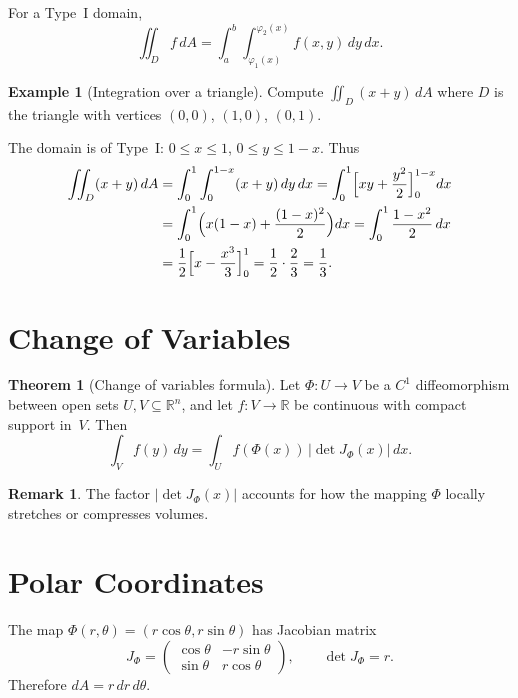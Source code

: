 \documentclass[12pt,a4paper]{book}
\theoremstyle{definition}
\newtheorem{theorem}{Theorem}[chapter]
\newtheorem{remark}{Remark}[chapter]
\newtheorem{example}{Example}[chapter]
\begin{document}
For a Type~I domain,
\[
  \iint_D f\,dA = \int_a^b\int_{\varphi_1(x)}^{\varphi_2(x)}
  f(x,y)\,dy\,dx.
\]

\begin{example}[Integration over a triangle]
\label{ex:triangle-integral}
Compute $\iint_D (x+y)\,dA$ where $D$ is the triangle with vertices
$(0,0)$, $(1,0)$, $(0,1)$.

The domain is of Type~I: $0\le x\le 1$, $0\le y\le 1-x$.  Thus
\begin{align*}
  \iint_D (x+y)\,dA
  &= \int_0^1\int_0^{1-x}(x+y)\,dy\,dx
  = \int_0^1\Bigl[xy+\frac{y^2}{2}\Bigr]_0^{1-x}dx \\
  &= \int_0^1\Bigl(x(1-x)+\frac{(1-x)^2}{2}\Bigr)dx
  = \int_0^1\frac{1-x^2}{2}\,dx \\
  &= \frac{1}{2}\Bigl[x-\frac{x^3}{3}\Bigr]_0^1
  = \frac{1}{2}\cdot\frac{2}{3}=\frac{1}{3}.
\end{align*}
\end{example}

\section{Change of Variables}
\label{sec:change-of-var}

\begin{theorem}[Change of variables formula]
\label{thm:change-of-var}
Let $\Phi\colon U\to V$ be a $C^1$ diffeomorphism between open sets
$U,V\subseteq\mathbb{R}^n$, and let $f\colon V\to\mathbb{R}$ be continuous
with compact support in~$V$.  Then
\[
  \int_V f(y)\,dy = \int_U f(\Phi(x))\,|\det J_\Phi(x)|\,dx.
\]
\end{theorem}

\begin{remark}
The factor $|\det J_\Phi(x)|$ accounts for how the mapping $\Phi$ locally
stretches or compresses volumes.
\end{remark}

\section{Polar Coordinates}
\label{sec:polar-coords}

The map $\Phi(r,\theta)=(r\cos\theta,r\sin\theta)$ has Jacobian matrix
\[
  J_\Phi = \begin{pmatrix}
    \cos\theta & -r\sin\theta \\
    \sin\theta & r\cos\theta
  \end{pmatrix},
  \qquad \det J_\Phi = r.
\]
Therefore $dA = r\,dr\,d\theta$.
\end{document}

